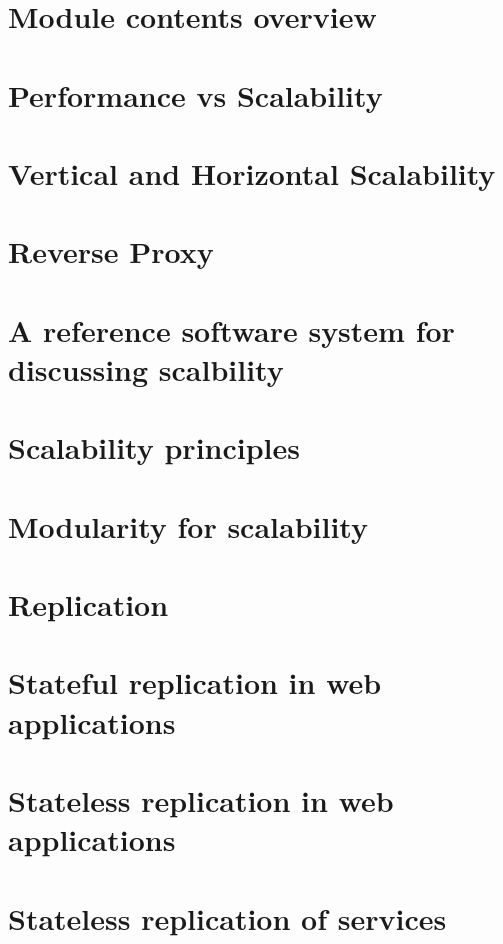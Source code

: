 \documentclass[11pt]{article}
\begin{document}
\section{Module contents overview}

\section{Performance vs Scalability}

\section{Vertical and Horizontal Scalability}

\section{Reverse Proxy}

\section{A reference software system for discussing scalbility}

\section{Scalability principles}

\section{Modularity for scalability}

\section{Replication}

\section{Stateful replication in web applications}

\section{Stateless replication in web applications}

\section{Stateless replication of services}
\end{document}
